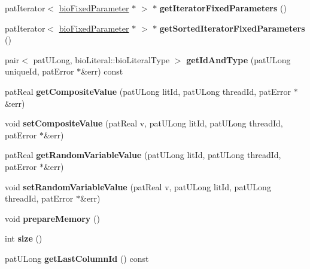 \begin{DoxyCompactItemize}
\item 
\mbox{\label{classbio_literal_repository_a8fbfa27624b35096c55e4f01a579b30c}} 
pat\+Iterator$<$ \hyperlink{classbio_fixed_parameter}{bio\+Fixed\+Parameter} $\ast$ $>$ $\ast$ {\bfseries get\+Iterator\+Fixed\+Parameters} ()
\item 
\mbox{\label{classbio_literal_repository_a9f92ab150008937cc2045d8fce9e0674}} 
pat\+Iterator$<$ \hyperlink{classbio_fixed_parameter}{bio\+Fixed\+Parameter} $\ast$ $>$ $\ast$ {\bfseries get\+Sorted\+Iterator\+Fixed\+Parameters} ()
\item 
\mbox{\label{classbio_literal_repository_a198e5c54fe4cfdf61c0c016044439064}} 
pair$<$ pat\+U\+Long, bio\+Literal\+::bio\+Literal\+Type $>$ {\bfseries get\+Id\+And\+Type} (pat\+U\+Long unique\+Id, pat\+Error $\ast$\&err) const
\item 
\mbox{\label{classbio_literal_repository_adb52a95276e732c14eb56121d360a443}} 
pat\+Real {\bfseries get\+Composite\+Value} (pat\+U\+Long lit\+Id, pat\+U\+Long thread\+Id, pat\+Error $\ast$\&err)
\item 
\mbox{\label{classbio_literal_repository_a933ff0cf289551cef4b897edfc105a07}} 
void {\bfseries set\+Composite\+Value} (pat\+Real v, pat\+U\+Long lit\+Id, pat\+U\+Long thread\+Id, pat\+Error $\ast$\&err)
\item 
\mbox{\label{classbio_literal_repository_a28f44affedcebadcbaae6a248a6d4516}} 
pat\+Real {\bfseries get\+Random\+Variable\+Value} (pat\+U\+Long lit\+Id, pat\+U\+Long thread\+Id, pat\+Error $\ast$\&err)
\item 
\mbox{\label{classbio_literal_repository_a70ad5d5542b6ef7c5d715318da829b4e}} 
void {\bfseries set\+Random\+Variable\+Value} (pat\+Real v, pat\+U\+Long lit\+Id, pat\+U\+Long thread\+Id, pat\+Error $\ast$\&err)
\item 
\mbox{\label{classbio_literal_repository_af9ea459f15124311f03e5c57e17fc872}} 
void {\bfseries prepare\+Memory} ()
\item 
\mbox{\label{classbio_literal_repository_aa70ad51ea8f40e277fa13f0e9c82c8e1}} 
int {\bfseries size} ()
\item 
\mbox{\label{classbio_literal_repository_a94da79d77297540cb99791f6a4ca3dd0}} 
pat\+U\+Long {\bfseries get\+Last\+Column\+Id} () const
\end{DoxyCompactItemize}
